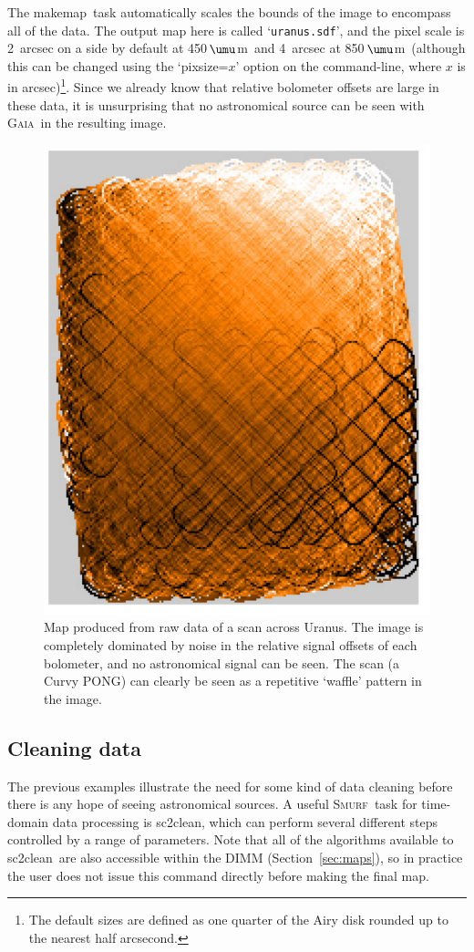 \documentclass[twoside,11pt]{article}
\newcommand{\micron}{\mbox{\,${\umu}$m}}            %
\newcommand{\xref}[3]{#1}
\newcommand{\xlabel}[1]{}
\renewcommand{\_}{\texttt{\symbol{95}}}
\newcommand{\gaia}{\xref{\textsc{Gaia}}{sun214}{}}
\newcommand{\smurf}{\xref{\textsc{Smurf}}{sun258}{}}
\newcommand{\task}[1]{\textsf{#1}}
\newcommand{\clean}{\xref{\task{sc2clean}}{sun258}{SC2CLEAN}}
\newcommand{\makemap}{\xref{\task{makemap}}{sun258}{MAKEMAP}}
\begin{document}
The \makemap\ task automatically scales the bounds of the image to
encompass all of the data. The output map here is called
`\texttt{uranus.sdf}', and the pixel scale is 2~arcsec on a side by
default at 450\micron\ and 4~arcsec at 850\micron\ (although this can
be changed using the `pixsize=$x$' option on the command-line, where
$x$ is in arcsec)\footnote{The default sizes are defined as one
  quarter of the Airy disk rounded up to the nearest half
  arcsecond.}. Since we already know that relative bolometer offsets
are large in these data, it is unsurprising that no astronomical
source can be seen with \gaia\ in the resulting image.

\begin{figure}
\begin{center}
\includegraphics[width=0.5\linewidth]{sc19_rawmap}
\caption{Map produced from raw data of a scan across Uranus. The
  image is completely dominated by noise in the relative signal
  offsets of each bolometer, and no astronomical signal can be
  seen. The scan (a Curvy PONG) can clearly be seen as a repetitive
  `waffle' pattern in the image.}
\label{fig:rawmap}
\end{center}
\end{figure}

\subsection{\xlabel{clean}Cleaning data}

The previous examples illustrate the need for some kind of data
cleaning before there is any hope of seeing astronomical sources. A
useful \smurf\ task for time-domain data processing is \clean, which
can perform several different steps controlled by a range of
parameters. Note that all of the algorithms available to \clean\ are
also accessible within the DIMM (Section~\ref{sec:maps}), so in
practice the user does not issue this command directly before making
the final map.
\end{document}
